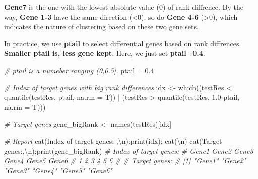 \documentclass[
  12pt,
]{book}
\newenvironment{Shaded}{\begin{snugshade}}{\end{snugshade}}
\newcommand{\AttributeTok}[1]{\textcolor[rgb]{0.77,0.63,0.00}{#1}}
\newcommand{\CommentTok}[1]{\textcolor[rgb]{0.56,0.35,0.01}{\textit{#1}}}
\newcommand{\FloatTok}[1]{\textcolor[rgb]{0.00,0.00,0.81}{#1}}
\newcommand{\FunctionTok}[1]{\textcolor[rgb]{0.00,0.00,0.00}{#1}}
\newcommand{\NormalTok}[1]{#1}
\newcommand{\OtherTok}[1]{\textcolor[rgb]{0.56,0.35,0.01}{#1}}
\newcommand{\SpecialCharTok}[1]{\textcolor[rgb]{0.00,0.00,0.00}{#1}}
\newcommand{\StringTok}[1]{\textcolor[rgb]{0.31,0.60,0.02}{#1}}
\begin{document}
\textbf{Gene7} is the one with the lowest absolute value (0) of rank diffrence. By the way, \textbf{Gene 1-3} have the same direction (\textless0), so do \textbf{Gene 4-6} (\textgreater0), which indicates the nature of clustering based on these two gene sets.

In practice, we use \textbf{ptail} to select differential genes based on rank diffrences. \textbf{Smaller ptail is, less gene kept}. Here, we just set \textbf{ptail=0.4}:

\begin{Shaded}
\begin{Highlighting}[]

\CommentTok{\# ptail is a numeber ranging (0,0.5].}
\NormalTok{ptail }\OtherTok{=} \FloatTok{0.4}

\CommentTok{\# Index of target genes with big rank differences}
\NormalTok{idx }\OtherTok{\textless{}{-}} \FunctionTok{which}\NormalTok{((testRes }\SpecialCharTok{\textless{}} \FunctionTok{quantile}\NormalTok{(testRes, ptail, }\AttributeTok{na.rm =}\NormalTok{ T)) }\SpecialCharTok{|} 
\NormalTok{             (testRes }\SpecialCharTok{\textgreater{}} \FunctionTok{quantile}\NormalTok{(testRes, }\FloatTok{1.0}\SpecialCharTok{{-}}\NormalTok{ptail, }\AttributeTok{na.rm =}\NormalTok{ T)))}

\CommentTok{\# Target genes}
\NormalTok{gene\_bigRank }\OtherTok{\textless{}{-}} \FunctionTok{names}\NormalTok{(testRes)[idx]}

\CommentTok{\# Report}
\FunctionTok{cat}\NormalTok{(}\StringTok{\textquotesingle{}Index of target genes: \textquotesingle{}}\NormalTok{,}\StringTok{\textquotesingle{}}\SpecialCharTok{\textbackslash{}n}\StringTok{\textquotesingle{}}\NormalTok{);}\FunctionTok{print}\NormalTok{(idx); }\FunctionTok{cat}\NormalTok{(}\StringTok{\textquotesingle{}}\SpecialCharTok{\textbackslash{}n}\StringTok{\textquotesingle{}}\NormalTok{)}
\FunctionTok{cat}\NormalTok{(}\StringTok{\textquotesingle{}Target genes:\textquotesingle{}}\NormalTok{,}\StringTok{\textquotesingle{}}\SpecialCharTok{\textbackslash{}n}\StringTok{\textquotesingle{}}\NormalTok{);}\FunctionTok{print}\NormalTok{(gene\_bigRank)}
\CommentTok{\# Index of target genes:  }
\CommentTok{\# Gene1 Gene2 Gene3 Gene4 Gene5 Gene6 }
\CommentTok{\#     1     2     3     4     5     6 }
\CommentTok{\# }
\CommentTok{\# Target genes: }
\CommentTok{\# [1] "Gene1" "Gene2" "Gene3" "Gene4" "Gene5" "Gene6"}
\end{Highlighting}
\end{Shaded}
\end{document}
